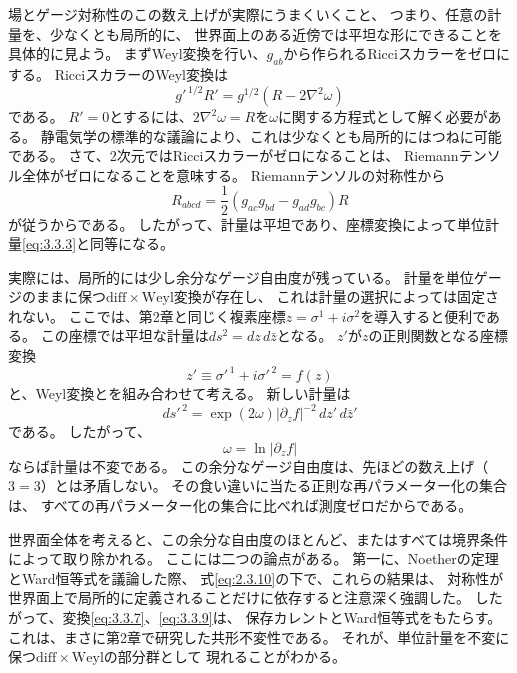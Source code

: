 場とゲージ対称性のこの数え上げが実際にうまくいくこと、
つまり、任意の計量を、少なくとも局所的に、
世界面上のある近傍では平坦な形にできることを具体的に見よう。
まずWeyl変換を行い、$g_{ab}$から作られるRicciスカラーをゼロにする。
RicciスカラーのWeyl変換は
\begin{equation}
g'^{\,1/2}R'=g^{1/2}(R-2\nabla^2\omega)
\tag{3.3.5}\label{eq:3.3.5}
\end{equation}
である。
$R'=0$とするには、$2\nabla^2\omega=R$を$\omega$に関する方程式として解く必要がある。
静電気学の標準的な議論により、これは少なくとも局所的にはつねに可能である。
さて、2次元ではRicciスカラーがゼロになることは、
Riemannテンソル全体がゼロになることを意味する。
Riemannテンソルの対称性から
\begin{equation}
R_{abcd}=\frac12(g_{ac}g_{bd}-g_{ad}g_{bc})R
\tag{3.3.6}\label{eq:3.3.6}
\end{equation}
が従うからである。
したがって、計量は平坦であり、座標変換によって単位計量\eqref{eq:3.3.3}と同等になる。

実際には、局所的には少し余分なゲージ自由度が残っている。
計量を単位ゲージのままに保つ$\mathrm{diff}\times\mathrm{Weyl}$変換が存在し、
これは計量の選択によっては固定されない。
ここでは、第2章と同じく複素座標$z=\sigma^1+i\sigma^2$を導入すると便利である。
この座標では平坦な計量は$ds^2=dz\,d\bar z$となる。
$z'$が$z$の正則関数となる座標変換
\begin{equation}
z'\equiv\sigma'^{\,1}+i\sigma'^{\,2}=f(z)
\tag{3.3.7}\label{eq:3.3.7}
\end{equation}
と、Weyl変換とを組み合わせて考える。
新しい計量は
\begin{equation}
ds'^{\,2}=\exp(2\omega)|\partial_zf|^{-2}\,dz'\,d\bar z'
\tag{3.3.8}\label{eq:3.3.8}
\end{equation}
である。
したがって、
\begin{equation}
\omega=\ln|\partial_zf|
\tag{3.3.9}\label{eq:3.3.9}
\end{equation}
ならば計量は不変である。
この余分なゲージ自由度は、先ほどの数え上げ（$3=3$）とは矛盾しない。
その食い違いに当たる正則な再パラメーター化の集合は、
すべての再パラメーター化の集合に比べれば測度ゼロだからである。

世界面全体を考えると、この余分な自由度のほとんど、またはすべては境界条件によって取り除かれる。
ここには二つの論点がある。
第一に、Noetherの定理とWard恒等式を議論した際、
式\eqref{eq:2.3.10}の下で、これらの結果は、
対称性が世界面上で局所的に定義されることだけに依存すると注意深く強調した。
したがって、変換\eqref{eq:3.3.7}、\eqref{eq:3.3.9}は、
保存カレントとWard恒等式をもたらす。
これは、まさに第2章で研究した共形不変性である。
それが、単位計量を不変に保つ$\mathrm{diff}\times\mathrm{Weyl}$の部分群として
現れることがわかる。

